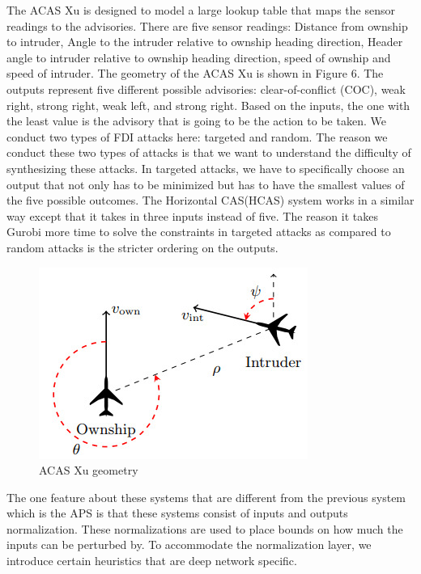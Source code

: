 The ACAS Xu is designed to model a large lookup table that maps the sensor readings to the advisories. There are five sensor readings:  Distance from ownship to intruder, Angle to the intruder relative to ownship heading direction, Header angle to intruder relative to ownship heading direction, speed of ownship and speed of intruder. The geometry of the ACAS Xu is shown in Figure 6. The outputs represent five different possible advisories: clear-of-conflict (COC), weak right, strong right, weak left, and strong right. Based on the inputs, the one with the least value is the advisory that is going to be the action to be taken.  We conduct two types of FDI attacks here: targeted and random. The reason we conduct these two types of attacks is that we want to understand the difficulty of synthesizing these attacks. In targeted attacks, we have to specifically choose an output that not only has to be minimized but has to have the smallest values of the five possible outcomes. The Horizontal CAS(HCAS) system works in a similar way except that it takes in three inputs instead of five. %
The reason it takes Gurobi more time to solve the constraints in targeted attacks as compared to random attacks is the stricter ordering on the outputs.

\begin{figure}
	\centering
	\includegraphics[width=0.7\linewidth]{Images/ACASXugeometry}
	\caption[ACAS Xu]{ACAS Xu geometry}
	\label{fig:acasxugeometry}
\end{figure}

The one feature about these systems that are different from the previous system which is the APS is that these systems consist of inputs and outputs normalization. These normalizations are used to place bounds on how much the inputs can be perturbed by. To accommodate the normalization layer, we introduce certain heuristics that are deep network specific. %

